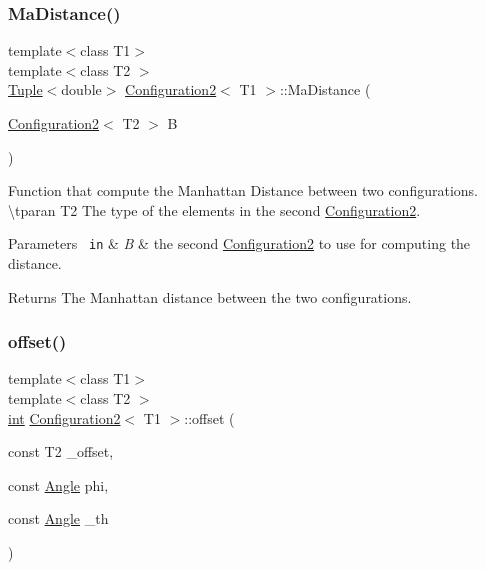 \subsubsection{\texorpdfstring{MaDistance()}{MaDistance()}}
{\footnotesize\ttfamily template$<$class T1$>$ \\
template$<$class T2 $>$ \\
\mbox{\hyperlink{class_tuple}{Tuple}}$<$double$>$ \mbox{\hyperlink{class_configuration2}{Configuration2}}$<$ T1 $>$\+::Ma\+Distance (\begin{DoxyParamCaption}\item[{\mbox{\hyperlink{class_configuration2}{Configuration2}}$<$ T2 $>$}]{B }\end{DoxyParamCaption})\hspace{0.3cm}{\ttfamily [inline]}}



Function that compute the Manhattan Distance between two configurations. \textbackslash{}tparan T2 The type of the elements in the second {\ttfamily \mbox{\hyperlink{class_configuration2}{Configuration2}}}. 


\begin{DoxyParams}[1]{Parameters}
\mbox{\texttt{ in}}  & {\em B} & the second {\ttfamily \mbox{\hyperlink{class_configuration2}{Configuration2}}} to use for computing the distance. \\
\hline
\end{DoxyParams}
\begin{DoxyReturn}{Returns}
The Manhattan distance between the two configurations. 
\end{DoxyReturn}
\mbox{\label{class_configuration2_a4c3bb49ce67ceb4b1b492cb7c093ea8c}} 
\subsubsection{\texorpdfstring{offset()}{offset()}\hspace{0.1cm}{\footnotesize\ttfamily [1/3]}}
{\footnotesize\ttfamily template$<$class T1$>$ \\
template$<$class T2 $>$ \\
\mbox{\hyperlink{draw_8hh_aa620a13339ac3a1177c86edc549fda9b}{int}} \mbox{\hyperlink{class_configuration2}{Configuration2}}$<$ T1 $>$\+::offset (\begin{DoxyParamCaption}\item[{const T2}]{\+\_\+offset,  }\item[{const \mbox{\hyperlink{class_angle}{Angle}}}]{phi,  }\item[{const \mbox{\hyperlink{class_angle}{Angle}}}]{\+\_\+th }\end{DoxyParamCaption})\hspace{0.3cm}{\ttfamily [inline]}}



